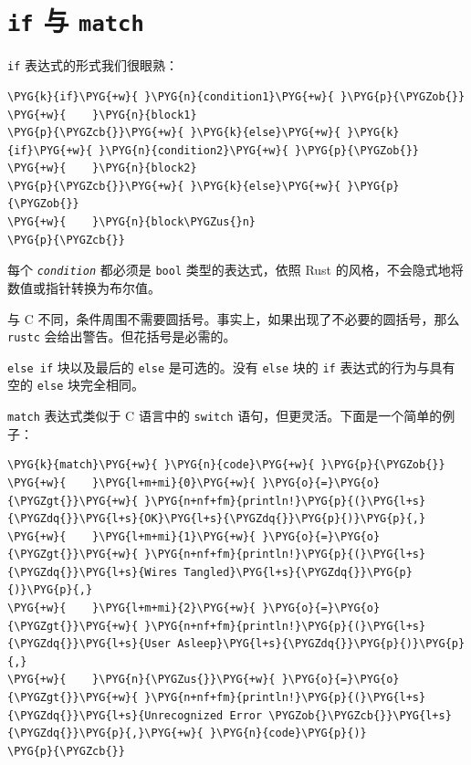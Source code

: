 \section{\texttt{if} 与 \texttt{match}}

\texttt{if} 表达式的形式我们很眼熟：

\begin{Verbatim}[commandchars=\\\{\},breaklines=true,breakanywhere=true,fontsize=\codefont,xleftmargin=17bp]
\PYG{k}{if}\PYG{+w}{ }\PYG{n}{condition1}\PYG{+w}{ }\PYG{p}{\PYGZob{}}
\PYG{+w}{    }\PYG{n}{block1}
\PYG{p}{\PYGZcb{}}\PYG{+w}{ }\PYG{k}{else}\PYG{+w}{ }\PYG{k}{if}\PYG{+w}{ }\PYG{n}{condition2}\PYG{+w}{ }\PYG{p}{\PYGZob{}}
\PYG{+w}{    }\PYG{n}{block2}
\PYG{p}{\PYGZcb{}}\PYG{+w}{ }\PYG{k}{else}\PYG{+w}{ }\PYG{p}{\PYGZob{}}
\PYG{+w}{    }\PYG{n}{block\PYGZus{}n}
\PYG{p}{\PYGZcb{}}
\end{Verbatim}

每个 \emph{\texttt{condition}} 都必须是 \texttt{bool} 类型的表达式，依照 Rust 的风格，不会隐式地将数值或指针转换为布尔值。

与 C 不同，条件周围不需要圆括号。事实上，如果出现了不必要的圆括号，那么 \texttt{rustc} 会给出警告。但花括号是必需的。

\texttt{else if} 块以及最后的 \texttt{else} 是可选的。没有 \texttt{else} 块的 \texttt{if} 表达式的行为与具有空的 \texttt{else} 块完全相同。

\texttt{match} 表达式类似于 C 语言中的 \texttt{switch} 语句，但更灵活。下面是一个简单的例子：

\begin{Verbatim}[commandchars=\\\{\},breaklines=true,breakanywhere=true,fontsize=\codefont,xleftmargin=17bp]
\PYG{k}{match}\PYG{+w}{ }\PYG{n}{code}\PYG{+w}{ }\PYG{p}{\PYGZob{}}
\PYG{+w}{    }\PYG{l+m+mi}{0}\PYG{+w}{ }\PYG{o}{=}\PYG{o}{\PYGZgt{}}\PYG{+w}{ }\PYG{n+nf+fm}{println!}\PYG{p}{(}\PYG{l+s}{\PYGZdq{}}\PYG{l+s}{OK}\PYG{l+s}{\PYGZdq{}}\PYG{p}{)}\PYG{p}{,}
\PYG{+w}{    }\PYG{l+m+mi}{1}\PYG{+w}{ }\PYG{o}{=}\PYG{o}{\PYGZgt{}}\PYG{+w}{ }\PYG{n+nf+fm}{println!}\PYG{p}{(}\PYG{l+s}{\PYGZdq{}}\PYG{l+s}{Wires Tangled}\PYG{l+s}{\PYGZdq{}}\PYG{p}{)}\PYG{p}{,}
\PYG{+w}{    }\PYG{l+m+mi}{2}\PYG{+w}{ }\PYG{o}{=}\PYG{o}{\PYGZgt{}}\PYG{+w}{ }\PYG{n+nf+fm}{println!}\PYG{p}{(}\PYG{l+s}{\PYGZdq{}}\PYG{l+s}{User Asleep}\PYG{l+s}{\PYGZdq{}}\PYG{p}{)}\PYG{p}{,}
\PYG{+w}{    }\PYG{n}{\PYGZus{}}\PYG{+w}{ }\PYG{o}{=}\PYG{o}{\PYGZgt{}}\PYG{+w}{ }\PYG{n+nf+fm}{println!}\PYG{p}{(}\PYG{l+s}{\PYGZdq{}}\PYG{l+s}{Unrecognized Error \PYGZob{}\PYGZcb{}}\PYG{l+s}{\PYGZdq{}}\PYG{p}{,}\PYG{+w}{ }\PYG{n}{code}\PYG{p}{)}
\PYG{p}{\PYGZcb{}}
\end{Verbatim}

